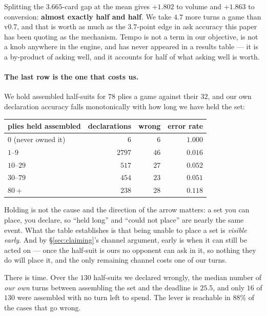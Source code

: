 \documentclass[11pt,a4paper]{article}
\begin{document}
\noindent Splitting the $3.665$-card gap at the mean gives $+1.802$ to volume
and $+1.863$ to conversion: \textbf{almost exactly half and half}. We take
$4.7$ more turns a game than v0.7, and that is worth as much as the
$3.7$-point edge in ask accuracy this paper has been quoting as the mechanism.
Tempo is not a term in our objective, is not a knob anywhere in the engine,
and has never appeared in a results table --- it is a by-product of asking
well, and it accounts for half of what asking well is worth.

\paragraph{The last row is the one that costs us.} We hold assembled
half-suits for $78$ plies a game against their $32$, and our own declaration
accuracy falls monotonically with how long we have held the set:

\begin{center}
\small
\begin{tabular}{lrrr}
\toprule
plies held assembled & declarations & wrong & error rate \\
\midrule
$0$ (never owned it) & $6$ & $6$ & $1.000$ \\
$1$--$9$ & $2797$ & $46$ & $0.016$ \\
$10$--$29$ & $517$ & $27$ & $0.052$ \\
$30$--$79$ & $454$ & $23$ & $0.051$ \\
$80+$ & $238$ & $28$ & $\mathbf{0.118}$ \\
\bottomrule
\end{tabular}
\end{center}

\noindent Holding is not the cause and the direction of the arrow matters: a
set you can place, you declare, so ``held long'' and ``could not place'' are
nearly the same event. What the table establishes is that being unable to
place a set is \emph{visible early}. And by \S\ref{sec:claiming}'s channel
argument, early is when it can still be acted on --- once the half-suit is
ours no opponent can ask in it, so nothing they do will place it, and the only
remaining channel costs one of our turns.

There is time. Over the $130$ half-suits we declared wrongly, the median
number of \emph{our own} turns between assembling the set and the deadline is
$25.5$, and only $16$ of $130$ were assembled with no turn left to spend. The
lever is reachable in $88\%$ of the cases that go wrong.
\end{document}
